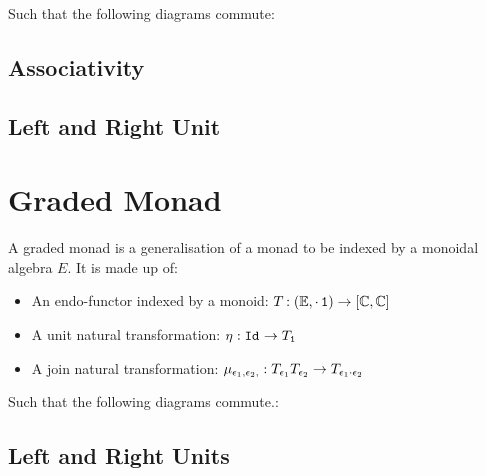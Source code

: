\documentclass{Report}
\begin{document}
Such that the following diagrams commute:

\subsection{Associativity}


\subsection{Left and Right Unit}



\section{Graded Monad}
A graded monad is a generalisation of a monad to be indexed by a monoidal algebra $E$. It is made up of:

\begin{itemize}
    \item An endo-functor indexed by a monoid: $T_{}{}: (\mathbb{E}, \cdot\, \texttt{1})  \rightarrow [\mathbb{C}, \mathbb{C}]$
    \item A unit natural transformation: $\eta_{}: \texttt{Id}_{} \rightarrow T_{\texttt{1}}{}$
    \item A join natural transformation: $\mu_{\epsilon_1, \epsilon_2, }: T_{\epsilon_1}{T_{\epsilon_2}{}} \rightarrow T_{\epsilon_1 \cdot \epsilon_2}{}$
\end{itemize}

Such that the following diagrams commute.:
\subsection{Left and Right  Units}
\end{document}
